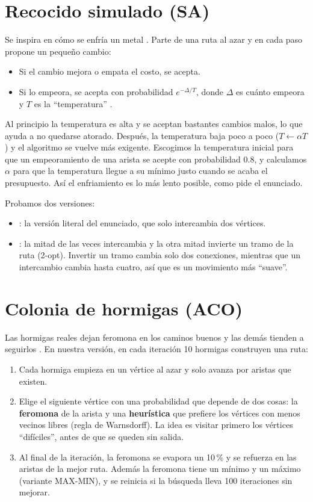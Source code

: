\section{Recocido simulado (SA)}
\label{sec:sa}
Se inspira en cómo se enfría un metal \cite{sa4}. Parte de una ruta al azar y en cada paso propone
un pequeño cambio:
\begin{itemize}
  \item Si el cambio mejora o empata el costo, se acepta.
  \item Si lo empeora, se acepta con probabilidad $e^{-\Delta/T}$, donde $\Delta$ es cuánto
        empeora y $T$ es la ``temperatura'' \cite{sa8}.
\end{itemize}
Al principio la temperatura es alta y se aceptan bastantes cambios malos, lo que ayuda a no
quedarse atorado. Después, la temperatura baja poco a poco ($T \leftarrow \alpha T$) y el
algoritmo se vuelve más exigente. Escogimos la temperatura inicial para que un empeoramiento de
una arista se acepte con probabilidad 0.8, y calculamos $\alpha$ para que la temperatura llegue a
su mínimo justo cuando se acaba el presupuesto. Así el enfriamiento es lo más lento posible, como
pide el enunciado.

Probamos dos versiones:
\begin{itemize}
  \item {}: la versión literal del enunciado, que solo intercambia dos vértices.
  \item {}: la mitad de las veces intercambia y la otra mitad invierte un tramo de
        la ruta (2-opt). Invertir un tramo cambia solo dos conexiones, mientras que un
        intercambio cambia hasta cuatro, así que es un movimiento más ``suave''.
\end{itemize}

\section{Colonia de hormigas (ACO)}
\label{sec:aco}
Las hormigas reales dejan feromona en los caminos buenos y las demás tienden a seguirlos
\cite{aco1,aco3}. En nuestra versión, en cada iteración 10 hormigas construyen una ruta:
\begin{enumerate}
  \item Cada hormiga empieza en un vértice al azar y solo avanza por aristas que existen.
  \item Elige el siguiente vértice con una probabilidad que depende de dos cosas: la
        \textbf{feromona} de la arista y una \textbf{heurística} que prefiere los vértices con
        menos vecinos libres (regla de Warnsdorff). La idea es visitar primero los vértices
        ``difíciles'', antes de que se queden sin salida.
  \item Al final de la iteración, la feromona se evapora un 10\,\% y se refuerza en las aristas
        de la mejor ruta. Además la feromona tiene un mínimo y un máximo (variante MAX-MIN), y se
        reinicia si la búsqueda lleva 100 iteraciones sin mejorar.
\end{enumerate}

